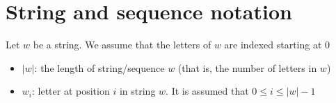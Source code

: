 \documentclass[10pt]{article}
\begin{document}
\section{String and sequence notation}
Let $w$ be a string. We assume that the letters of $w$ are indexed starting at $0$ 
\begin{itemize}
\item {\color{blue} $|w|$}: the length of string/sequence $w$ (that is, the number of letters in $w$)
\item {\color{blue} $w_i$}: letter at position $i$ in string $w$. It is assumed that $0 \leq i \leq |w|-1$

\end{itemize}
\end{document}
